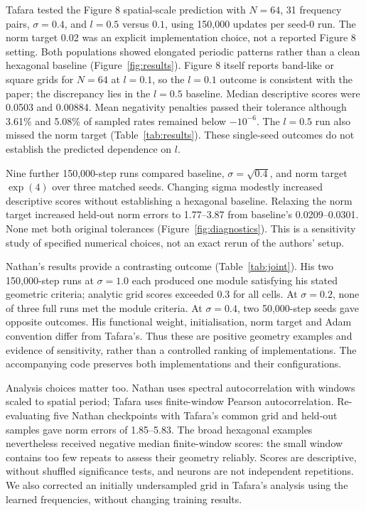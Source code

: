 \documentclass[10pt,letterpaper]{article}
\begin{document}
Tafara tested the Figure 8 spatial-scale prediction with $N=64$, 31 frequency pairs, $\sigma=0.4$, and $l=0.5$ versus $0.1$, using 150,000 updates per seed-0 run. The norm target 0.02 was an explicit implementation choice, not a reported Figure 8 setting. Both populations showed elongated periodic patterns rather than a clean hexagonal baseline (Figure~\ref{fig:results}). Figure 8 itself reports band-like or square grids for $N=64$ at $l=0.1$, so the $l=0.1$ outcome is consistent with the paper; the discrepancy lies in the $l=0.5$ baseline. Median descriptive scores were 0.0503 and 0.00884. Mean negativity penalties passed their tolerance although 3.61\% and 5.08\% of sampled rates remained below $-10^{-6}$. The $l=0.5$ run also missed the norm target (Table~\ref{tab:results}). These single-seed outcomes do not establish the predicted dependence on $l$.

Nine further 150,000-step runs compared baseline, $\sigma=\sqrt{0.4}$, and norm target $\exp(4)$ over three matched seeds. Changing sigma modestly increased descriptive scores without establishing a hexagonal baseline. Relaxing the norm target increased held-out norm errors to 1.77--3.87 from baseline's 0.0209--0.0301. None met both original tolerances (Figure~\ref{fig:diagnostics}). This is a sensitivity study of specified numerical choices, not an exact rerun of the authors' setup.

Nathan's results provide a contrasting outcome (Table~\ref{tab:joint}). His two 150,000-step runs at $\sigma=1.0$ each produced one module satisfying his stated geometric criteria; analytic grid scores exceeded 0.3 for all cells. At $\sigma=0.2$, none of three full runs met the module criteria. At $\sigma=0.4$, two 50,000-step seeds gave opposite outcomes. His functional weight, initialisation, norm target and Adam convention differ from Tafara's. Thus these are positive geometry examples and evidence of sensitivity, rather than a controlled ranking of implementations. The accompanying code preserves both implementations and their configurations.

Analysis choices matter too. Nathan uses spectral autocorrelation with windows scaled to spatial period; Tafara uses finite-window Pearson autocorrelation. Re-evaluating five Nathan checkpoints with Tafara's common grid and held-out samples gave norm errors of 1.85--5.83. The broad hexagonal examples nevertheless received negative median finite-window scores: the small window contains too few repeats to assess their geometry reliably. Scores are descriptive, without shuffled significance tests, and neurons are not independent repetitions. We also corrected an initially undersampled grid in Tafara's analysis using the learned frequencies, without changing training results.
\end{document}
